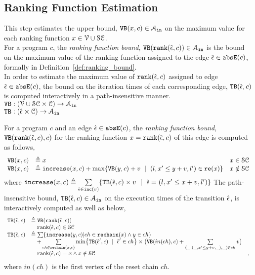   \subsection{Ranking Function Estimation}
  This step estimates the upper bound, ${\mathtt{VB}}(x, c) \in \mathcal{A}_{\mathtt{in}}$
  on the maximum value for each ranking function   $x \in  \mathcal{V} \cup \mathcal{SC}$.
  \\
  For a program $c$, the \emph{ranking function bound},
  ${\mathtt{VB}}(\mathtt{rank}(\hat{\mathtt{\epsilon}{}}, c)) \in \mathcal{A}_{\mathtt{in}}$ is 
  the bound on the maximum value of the ranking function  
  assigned to the edge $\hat{\mathtt{\epsilon}{}} \in \mathtt{abs}{\mathtt{E}}(c)$, formally in Definition~\ref{def:ranking_bound}.
  \\
  In order to estimate the maximum value of $\mathtt{rank}(\hat{\mathtt{\epsilon}{}}, c)$ assigned to edge $\hat{\mathtt{\epsilon}{}} \in \mathtt{abs}{\mathtt{E}}(c)$,
  the bound on the iteration times of each corresponding edge, ${\mathtt{TB}}(\hat{\mathtt{\epsilon}{}}, c)$ 
  is computed interactively in a path-insensitive manner.
  \\ 
  $ {\mathtt{VB}}: (\mathcal{V} \cup \mathcal{SC}  \times \mathcal{C}) \to \mathcal{A}_{\mathtt{in}}$
  \\
  ${\mathtt{TB}}: (\hat{\mathtt{\epsilon}{}} \times \mathcal{C}) \to \mathcal{A}_{\mathtt{in}}$
  \begin{defn}
    \label{def:ranking_bound}
  For a program $c$ and an edge $\hat{\mathtt{\epsilon}{}} \in \mathtt{abs}{\mathtt{E}}(c)$,
  the \emph{ranking function bound}, 
  ${\mathtt{VB}}(\mathtt{rank}(\hat{\mathtt{\epsilon}{}}, c), c)$ for the ranking function $x = \mathtt{rank}(\hat{\mathtt{\epsilon}{}}, c)$
  of this edge
  is computed as follows,
    \[ 
  \begin{array}{lll}
    \varinvar(x, c) & \triangleq x & x \in \constdom \\
    \varinvar(x, c) & \triangleq \incrs(x, c) + \max\left\{\varinvar(y, c) + v ~\mid~ (l, x' \leq y + v, l') \in \reset(x) \right\} & x \notin \constdom
  \end{array}
  \]
  where $\mathtt{increase}(x, c) \triangleq \sum\limits_{\hat{\mathtt{\epsilon}{}} \in \mathtt{inc}(v)}\{{\mathtt{TB}}(\hat{\mathtt{\epsilon}{}}, c) \times v ~\mid~ \hat{\mathtt{\epsilon}{}} = (l, x' \leq x + v, l')\}$
  The path-insensitive bound, ${\mathtt{TB}}(\hat{\mathtt{\epsilon}{}}, c) \in \mathcal{A}_{\mathtt{in}}$  on the execution times of the transition $\hat{\mathtt{\epsilon}{}}$, is interactively computed as well as below,
\[ 
\begin{array}{lll}
  \absclr(\absevent, c) 
  & \triangleq \varinvar(\locbound(\absevent, c))  & \\
  & \quad \locbound(\absevent, c) \in \constdom & \\
  \absclr(\absevent, c) 
  & \triangleq
    \sum \left\{ \incrs(y, c) | ch \in \resetchain(x) \land y \in ch \right\} & \\
    & \quad + 
  \sum\limits_{ch \in \resetchain(x, c)}
  \min \left\{\absclr(\absevent', c) ~\mid~ \absevent' \in ch\right\} \times 
  \big(\varinvar(in(ch), c) 
  + \sum\limits_{(\_, (\_, x' \leq y + v, \_), \_) \in ch} v \big) & \\
  &  \quad \locbound(\absevent, c) = x \land x \notin \constdom & ,
\end{array}
  \]
 where $in(ch)$ is the first vertex of the reset chain $ch$.
\end{defn}
